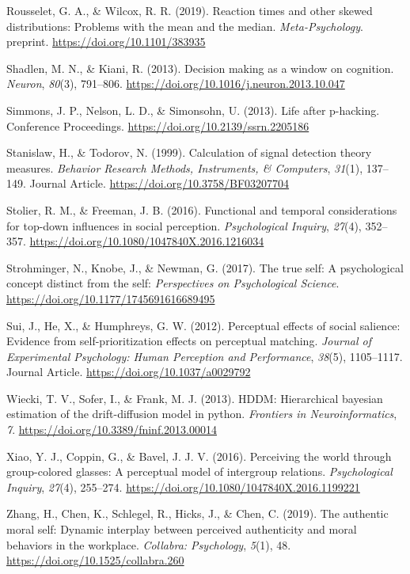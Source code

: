 \documentclass[
  english,
  man]{apa6}
\begin{document}
\leavevmode\hypertarget{ref-Rousselet_2019}{}%
Rousselet, G. A., \& Wilcox, R. R. (2019). Reaction times and other skewed distributions: Problems with the mean and the median. \emph{Meta-Psychology}. preprint. \url{https://doi.org/10.1101/383935}

\leavevmode\hypertarget{ref-shadlen_decision_2013}{}%
Shadlen, M. N., \& Kiani, R. (2013). Decision making as a window on cognition. \emph{Neuron}, \emph{80}(3), 791--806. \url{https://doi.org/10.1016/j.neuron.2013.10.047}

\leavevmode\hypertarget{ref-Simmons_2013_life}{}%
Simmons, J. P., Nelson, L. D., \& Simonsohn, U. (2013). Life after p-hacking. Conference Proceedings. \url{https://doi.org/10.2139/ssrn.2205186}

\leavevmode\hypertarget{ref-Stanislaw_Todorov_1999}{}%
Stanislaw, H., \& Todorov, N. (1999). Calculation of signal detection theory measures. \emph{Behavior Research Methods, Instruments, \& Computers}, \emph{31}(1), 137--149. Journal Article. \url{https://doi.org/10.3758/BF03207704}

\leavevmode\hypertarget{ref-stolier_functional_2016}{}%
Stolier, R. M., \& Freeman, J. B. (2016). Functional and temporal considerations for top-down influences in social perception. \emph{Psychological Inquiry}, \emph{27}(4), 352--357. \url{https://doi.org/10.1080/1047840X.2016.1216034}

\leavevmode\hypertarget{ref-strohminger_true_2017}{}%
Strohminger, N., Knobe, J., \& Newman, G. (2017). The true self: A psychological concept distinct from the self: \emph{Perspectives on Psychological Science}. \url{https://doi.org/10.1177/1745691616689495}

\leavevmode\hypertarget{ref-Sui_2012_JEPHPP}{}%
Sui, J., He, X., \& Humphreys, G. W. (2012). Perceptual effects of social salience: Evidence from self-prioritization effects on perceptual matching. \emph{Journal of Experimental Psychology: Human Perception and Performance}, \emph{38}(5), 1105--1117. Journal Article. \url{https://doi.org/10.1037/a0029792}

\leavevmode\hypertarget{ref-wiecki_hddm_2013}{}%
Wiecki, T. V., Sofer, I., \& Frank, M. J. (2013). HDDM: Hierarchical bayesian estimation of the drift-diffusion model in python. \emph{Frontiers in Neuroinformatics}, \emph{7}. \url{https://doi.org/10.3389/fninf.2013.00014}

\leavevmode\hypertarget{ref-xiao_perceiving_2016}{}%
Xiao, Y. J., Coppin, G., \& Bavel, J. J. V. (2016). Perceiving the world through group-colored glasses: A perceptual model of intergroup relations. \emph{Psychological Inquiry}, \emph{27}(4), 255--274. \url{https://doi.org/10.1080/1047840X.2016.1199221}

\leavevmode\hypertarget{ref-zhang_authentic_2019}{}%
Zhang, H., Chen, K., Schlegel, R., Hicks, J., \& Chen, C. (2019). The authentic moral self: Dynamic interplay between perceived authenticity and moral behaviors in the workplace. \emph{Collabra: Psychology}, \emph{5}(1), 48. \url{https://doi.org/10.1525/collabra.260}

\endgroup
\end{document}
